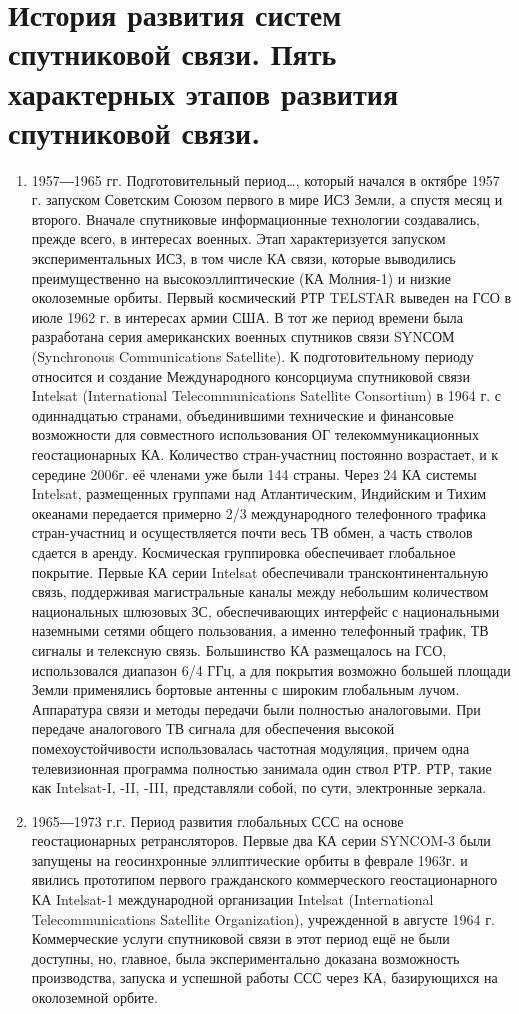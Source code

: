 \documentclass[14pt,a4paper,oneside]{extarticle}
\begin{document}
\section{История развития систем спутниковой связи. Пять характерных этапов развития спутниковой связи.}

\begin{enumerate}
    \item 1957―1965 гг. Подготовительный период…, который начался в октябре 1957 г. запуском Советским Союзом первого в мире ИСЗ Земли, а спустя месяц и второго. Вначале спутниковые информационные технологии создавались, прежде всего, в интересах военных. Этап характеризуется запуском экспериментальных ИСЗ, в том числе КА связи, которые выводились преимущественно на высокоэллиптические (КА Молния-1) и низкие околоземные  орбиты. Первый космический РТР TELSTAR выведен на ГСО в июле 1962 г. в интересах армии США. В тот же период времени была разработана серия американских военных спутников связи SYNСОМ (Synchronous Communications Satellite). К подготовительному периоду относится и создание Международного консорциума спутниковой связи Intelsat (International Telecommunications Satellite Consortium) в 1964 г. с одиннадцатью странами, объединившими технические и финансовые возможности для совместного использования ОГ телекоммуникационных геостационарных КА. Количество стран-участниц постоянно возрастает, и к середине 2006г. её членами уже были 144 страны. Через 24 КА системы Intelsat, размещенных группами над Атлантическим, Индийским и Тихим океанами передается примерно 2/3 международного телефонного трафика стран-участниц и осуществляется почти весь ТВ обмен, а часть стволов сдается в аренду. Космическая группировка обеспечивает глобальное покрытие. Первые КА серии Intelsat обеспечивали трансконтинентальную связь, поддерживая магистральные каналы между небольшим количеством национальных шлюзовых ЗС, обеспечивающих интерфейс с национальными наземными сетями общего пользования, а именно телефонный трафик, ТВ сигналы и телексную связь. Большинство КА размещалось на ГСО, использовался диапазон 6/4 ГГц, а для покрытия возможно большей площади Земли применялись бортовые антенны с широким глобальным лучом. Аппаратура связи и методы передачи были полностью аналоговыми. При передаче аналогового ТВ сигнала для обеспечения высокой помехоустойчивости использовалась частотная модуляция, причем одна телевизионная программа полностью занимала один ствол РТР. РТР, такие как Intelsat-I, -II, -III, представляли собой, по сути, электронные зеркала.
    \item 1965―1973 г.г. Период развития глобальных ССС на основе геостационарных ретрансляторов. Первые два КА серии SYNCOM-3 были запущены на геосинхронные эллиптические орбиты в феврале 1963г. и явились прототипом первого гражданского коммерческого геостационарного КА Intelsat-1 международной организации Intelsat (International Telecommunications Satellite Organization), учрежденной в августе 1964 г. Коммерческие услуги спутниковой связи в этот период ещё не были доступны, но, главное, была экспериментально доказана возможность производства, запуска и успешной работы ССС через КА, базирующихся на околоземной орбите.

\end{enumerate}
\end{document}
